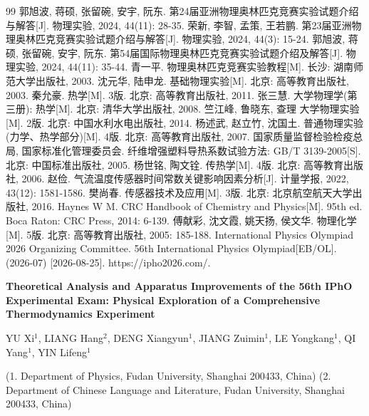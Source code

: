 \documentclass[10pt, a4paper]{ctexart}
\begin{document}
\begin{thebibliography}{99}
	 郭旭波, 蒋硕, 张留碗, 安宇, 阮东. 第24届亚洲物理奥林匹克竞赛实验试题介绍与解答[J]. 物理实验, 2024, 44(11): 28-35.
	 荣新, 李智, 孟策, 王若鹏. 第23届亚洲物理奥林匹克竞赛实验试题介绍与解答[J]. 物理实验, 2024, 44(3): 15-24.
	 郭旭波, 蒋硕, 张留碗, 安宇, 阮东. 第54届国际物理奥林匹克竞赛实验试题介绍及解答[J]. 物理实验, 2024, 44(11): 35-44.      
	 青一平. 物理奥林匹克竞赛实验教程[M]. 长沙: 湖南师范大学出版社, 2003.
	 沈元华, 陆申龙. 基础物理实验[M]. 北京: 高等教育出版社, 2003.
	 秦允豪. 热学[M]. 3版. 北京: 高等教育出版社, 2011.
	 张三慧. 大学物理学(第三册): 热学[M]. 北京: 清华大学出版社, 2008.
	 竺江峰, 鲁晓东, 查理 大学物理实验[M]. 2版. 北京: 中国水利水电出版社, 2014.
	 杨述武, 赵立竹, 沈国土. 普通物理实验(力学、热学部分)[M]. 4版. 北京: 高等教育出版社, 2007.
	 国家质量监督检验检疫总局, 国家标准化管理委员会. 纤维增强塑料导热系数试验方法: GB/T 3139-2005[S]. 北京: 中国标准出版社, 2005.
	 杨世铭, 陶文铨. 传热学[M]. 4版. 北京: 高等教育出版社, 2006.
	 赵俭. 气流温度传感器时间常数关键影响因素分析[J]. 计量学报, 2022, 43(12): 1581-1586.
	 樊尚春. 传感器技术及应用[M]. 3版. 北京: 北京航空航天大学出版社, 2016.
	 Haynes W M. CRC Handbook of Chemistry and Physics[M]. 95th ed. Boca Raton: CRC Press, 2014: 6-139.
	 傅献彩, 沈文霞, 姚天扬, 侯文华. 物理化学[M]. 5版. 北京: 高等教育出版社, 2005: 185-188.
	 International Physics Olympiad 2026 Organizing Committee. 56th International Physics Olympiad[EB/OL]. (2026-07) [2026-08-25]. https://ipho2026.com/.
\end{thebibliography}

\vspace{0.5cm}
\begin{center}
	{\Large \bfseries Theoretical Analysis and Apparatus Improvements of the 56th IPhO Experimental Exam: Physical Exploration of a Comprehensive Thermodynamics Experiment}
	
	\vspace{0.4cm}
	{\large YU Xi$^{1}$,  LIANG Hang$^{2}$, DENG Xiangyun$^{1}$,  JIANG Zuimin$^{1}$, LE Yongkang$^{1}$, QI Yang$^{1}$, YIN Lifeng$^{1}$}
	
	\vspace{0.2cm}
	{\small (1. Department of Physics, Fudan University, Shanghai 200433, China)} 
	{\small (2. Department of Chinese Language and Literature, Fudan University, Shanghai 200433, China)}
\end{center}
\end{document}
